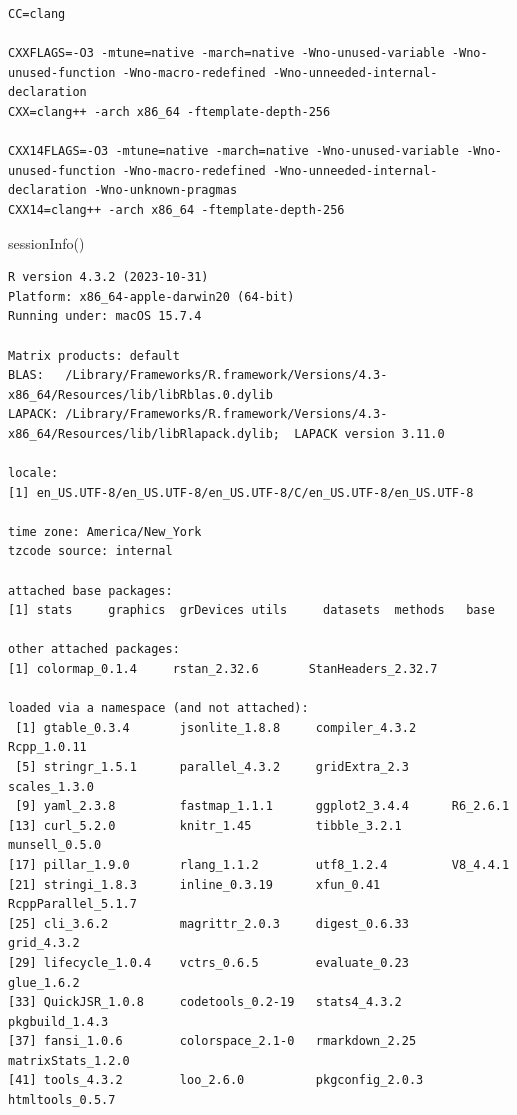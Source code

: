 \documentclass[
  letterpaper,
  DIV=11,
  numbers=noendperiod]{scrartcl}
\newenvironment{Shaded}{\begin{snugshade}}{\end{snugshade}}
\newcommand{\FunctionTok}[1]{\textcolor[rgb]{0.28,0.35,0.67}{#1}}
\newcommand{\NormalTok}[1]{\textcolor[rgb]{0.00,0.23,0.31}{#1}}
\begin{document}
\begin{verbatim}
CC=clang

CXXFLAGS=-O3 -mtune=native -march=native -Wno-unused-variable -Wno-unused-function -Wno-macro-redefined -Wno-unneeded-internal-declaration
CXX=clang++ -arch x86_64 -ftemplate-depth-256

CXX14FLAGS=-O3 -mtune=native -march=native -Wno-unused-variable -Wno-unused-function -Wno-macro-redefined -Wno-unneeded-internal-declaration -Wno-unknown-pragmas
CXX14=clang++ -arch x86_64 -ftemplate-depth-256
\end{verbatim}

\begin{Shaded}
\begin{Highlighting}[]
\FunctionTok{sessionInfo}\NormalTok{()}
\end{Highlighting}
\end{Shaded}

\begin{verbatim}
R version 4.3.2 (2023-10-31)
Platform: x86_64-apple-darwin20 (64-bit)
Running under: macOS 15.7.4

Matrix products: default
BLAS:   /Library/Frameworks/R.framework/Versions/4.3-x86_64/Resources/lib/libRblas.0.dylib 
LAPACK: /Library/Frameworks/R.framework/Versions/4.3-x86_64/Resources/lib/libRlapack.dylib;  LAPACK version 3.11.0

locale:
[1] en_US.UTF-8/en_US.UTF-8/en_US.UTF-8/C/en_US.UTF-8/en_US.UTF-8

time zone: America/New_York
tzcode source: internal

attached base packages:
[1] stats     graphics  grDevices utils     datasets  methods   base     

other attached packages:
[1] colormap_0.1.4     rstan_2.32.6       StanHeaders_2.32.7

loaded via a namespace (and not attached):
 [1] gtable_0.3.4       jsonlite_1.8.8     compiler_4.3.2     Rcpp_1.0.11       
 [5] stringr_1.5.1      parallel_4.3.2     gridExtra_2.3      scales_1.3.0      
 [9] yaml_2.3.8         fastmap_1.1.1      ggplot2_3.4.4      R6_2.6.1          
[13] curl_5.2.0         knitr_1.45         tibble_3.2.1       munsell_0.5.0     
[17] pillar_1.9.0       rlang_1.1.2        utf8_1.2.4         V8_4.4.1          
[21] stringi_1.8.3      inline_0.3.19      xfun_0.41          RcppParallel_5.1.7
[25] cli_3.6.2          magrittr_2.0.3     digest_0.6.33      grid_4.3.2        
[29] lifecycle_1.0.4    vctrs_0.6.5        evaluate_0.23      glue_1.6.2        
[33] QuickJSR_1.0.8     codetools_0.2-19   stats4_4.3.2       pkgbuild_1.4.3    
[37] fansi_1.0.6        colorspace_2.1-0   rmarkdown_2.25     matrixStats_1.2.0 
[41] tools_4.3.2        loo_2.6.0          pkgconfig_2.0.3    htmltools_0.5.7   
\end{verbatim}
\end{document}
